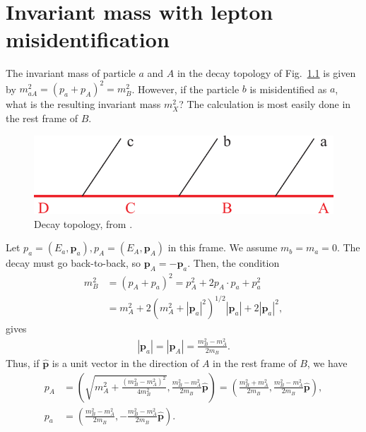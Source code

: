 \documentclass[twoside,english]{uiofysmaster}
\begin{document}

\chapter{Invariant mass with lepton misidentification}
\label{sec:appendix_invmass-calculations}
The invariant mass of particle $a$ and $A$ in the decay topology of Fig.\ \ref{fig:decaytree_appendix} is given by $m_{aA}^2 = (p_a + p_A)^2 = m_B^2$. However, if the particle $b$ is misidentified as $a$, what is the resulting invariant mass $m_X^2$? The calculation is most easily done in the rest frame of $B$. 
\begin{figure}[hbt]
\centering
\includegraphics[scale=0.7]{figures/fig-chain.pdf} %
\caption{Decay topology, from \cite{Miller:2005zp}.}
\label{fig:decaytree_appendix}
\end{figure}Let $p_a = (E_a, \mathbf p_a), p_A = (E_A, \mathbf p_A)$ in this frame. We assume $m_b = m_a = 0$. The decay must go back-to-back, so $\mathbf p_A = -\mathbf p_a$. Then, the condition
\begin{align}
	m_B^2 &= (p_A + p_a)^2 = p_A^2 + 2p_A \cdot p_a + p_a^2\\
	 		&= m_A^2 + 2\left( m_A^2 + |\mathbf p_a|^2 \right)^{1/2} |\mathbf p_a| + 2|\mathbf p_a|^2,
\end{align}
gives
\begin{align}
	|\mathbf{p}_a| = |\mathbf{p}_A| = \frac{m_B^2 - m_A^2}{2m_B}.
\end{align}
Thus, if $\hat{\mathbf{p}}$ is a unit vector in the direction of $A$ in the rest frame of $B$, we have
\begin{align}
	p_A &= \left( \sqrt{ m_A^2 + \frac{(m_B^2-m_A^2)^2}{4m_B^2} },  \frac{m_B^2-m_A^2}{2m_B}\hat{\mathbf{p}} \right) = \left( \frac{m_B^2+m_A^2}{2m_B},  \frac{m_B^2-m_A^2}{2m_B} \hat{\mathbf{p}} \right),\\
	p_a &= \left( \frac{m_B^2-m_A^2}{2m_B},  -\frac{m_B^2-m_A^2}{2m_B}\hat{\mathbf{p}} \right). \nonumber
\end{align}
\end{document}
